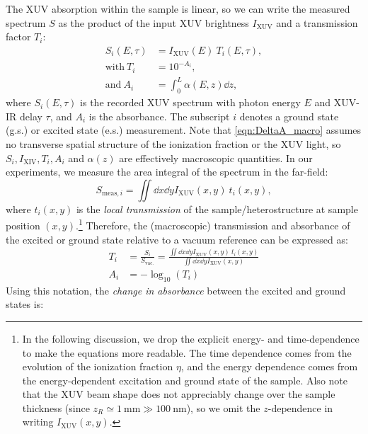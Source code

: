 The XUV absorption within the sample is linear, so we can write the measured spectrum $S$ as the product of the input XUV brightness $I_{\textrm{XUV}}$ and a transmission factor $T_i$:
\begin{equation}
\begin{aligned}
S_i(E, \tau) &= I_{\textrm{XUV}}(E) \ T_i(E, \tau), \\
\textrm{with} \ T_i &= 10^{- A_i}, \\
\textrm{and} \ A_i &= \int_{0}^{L} \alpha(E, z) \dd{z},
\end{aligned}
\label{eqn:DeltaA_macro}
\end{equation}
where $S_i(E,\tau)$ is the recorded XUV spectrum with photon energy $E$ and XUV-IR delay $\tau$, and $A_i$ is the absorbance. The subscript $i$ denotes a ground state (g.s.) or excited state (e.s.) measurement. Note that \cref{eqn:DeltaA_macro} assumes no transverse spatial structure of the ionization fraction or the XUV light, so $S_i, I_{\textrm{XIV}}, T_i, A_i$ and $\alpha(z)$ are effectively macroscopic quantities. In our experiments, we measure the area integral of the spectrum in the far-field:
\begin{equation}
S_{\textrm{meas},i} = \iint \dd{x} \dd{y} I_{\textrm{XUV}}(x,y) \ t_i(x,y),
\end{equation}
where $t_i(x,y)$ is the \textit{local transmission} of the sample/heterostructure at sample position $(x,y)$.\footnote{In the following discussion, we drop the explicit energy- and time-dependence to make the equations more readable. The time dependence comes from the evolution of the ionization fraction $\eta$, and the energy dependence comes from the energy-dependent excitation and ground state of the sample. Also note that the XUV beam shape does not appreciably change over the sample thickness (since $z_R \simeq 1 \ \textrm{mm} \gg 100 \ \textrm{nm}$), so we omit the $z$-dependence in writing $I_{\textrm{XUV}}(x,y)$.}  Therefore, the (macroscopic) transmission and absorbance of the excited or ground state relative to a vacuum reference can be expressed as:
\begin{equation}
\begin{aligned}
T_i &= \frac{S_i}{S_{\textrm{vac.}}} = \frac{\iint \dd{x} \dd{y} I_{\textrm{XUV}}(x,y) \ t_i(x,y)}{ \iint \dd{x} \dd{y} I_{\textrm{XUV}}(x,y)} \\
A_i &= - \log_{10}(T_i)
\end{aligned}
\end{equation}
Using this notation, the \textit{change in absorbance} between the excited and ground states is:
